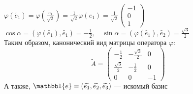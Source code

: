 \documentclass[a4paper]{article}
\newcommand{\e}{\mathbbl{e}}
\begin{document}
\indent $\varphi(\widetilde{e_1})=\varphi\left(\displaystyle\frac{e_1}{\sqrt{2}}\right)=\displaystyle\frac{1}{\sqrt{2}}\varphi(e_1)=\displaystyle\frac{1}{\sqrt{2}}\begin{pmatrix}
    -1\\
    0\\
    1
\end{pmatrix}$\\[2mm]
\indent $\cos{\alpha}=(\varphi(\widetilde{e_1}), \widetilde{e_1})=\displaystyle-\frac{1}{2},\quad \sin{\alpha}=(\varphi(\widetilde{e_1}), \widetilde{e_2})=\displaystyle\frac{\sqrt{3}}{2}$\\[2mm]
\indent Таким образом, канонический вид матрицы оператора $\varphi$:
\begin{equation*}
    \boxed{\widetilde{A}=\begin{pmatrix}
        -\frac{1}{2}&-\frac{\sqrt{3}}{2}&0\\[1mm]
        \frac{\sqrt{3}}{2}&-\frac{1}{2}&0\\[1mm]
        0&0&-1
    \end{pmatrix}}
\end{equation*}
\indent А также, $\e=(\widetilde{e_1}, \widetilde{e_2}, \widetilde{e_3})$ — искомый базис
\end{document}

